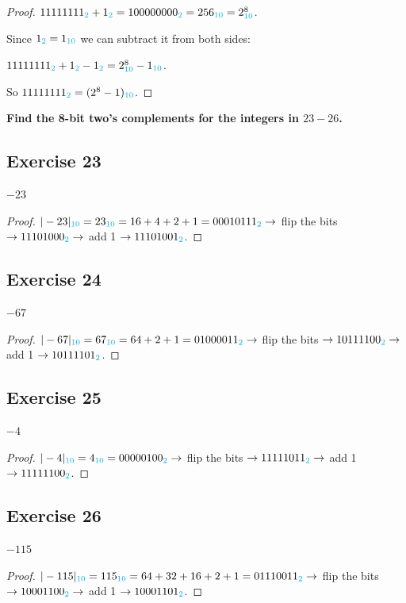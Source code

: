 \documentclass[14pt]{extarticle}
\newcommand{\base}[1]{{\color{cyan}#1}}
\begin{document}
\begin{proof} 
$11111111_\base{2} + 1_\base{2} = 100000000_\base{2} = 256_\base{10} = 2^8_\base{10}$.

Since $1_\base{2} = 1_\base{10}$ we can subtract it from both sides:

$11111111_\base{2} + 1_\base{2} - 1_\base{2} = 2^8_\base{10} - 1_\base{10}$.

So $11111111_\base{2} = (2^8 - 1)_\base{10}$. 
\end{proof}

{\bf\color{cyan} Find the 8-bit two’s complements for the integers in $23-26$.}

\subsection{Exercise 23} 
$-23$

\begin{proof} 
$|-23|_\base{10} = 23_\base{10} = 16 + 4 + 2 + 1 = 00010111_\base{2} \to$ flip the bits $\to 11101000_\base{2} \to$ add 1 $\to 11101001_\base{2}$. 
\end{proof}

\subsection{Exercise 24} 
$-67$

\begin{proof} $|-67|_\base{10} = 67_\base{10} = 64 + 2 + 1 = 01000011_\base{2} \to$ flip the bits $\to 10111100_\base{2} \to$ add 1 $\to 10111101_\base{2}$.
\end{proof}

\subsection{Exercise 25} 
$-4$

\begin{proof} 
$|-4|_\base{10} = 4_\base{10} = 00000100_\base{2} \to$ flip the
bits $\to 11111011_\base{2} \to$ add 1 $\to 11111100_\base{2}$. \end{proof}

\subsection{Exercise 26} 
$-115$

\begin{proof} 
$|-115|_\base{10} = 115_\base{10} = 64 + 32 + 16 + 2 + 1 = 01110011_\base{2} \to$ flip the bits $\to 10001100_\base{2} \to$ add 1 $\to 10001101_\base{2}$. 
\end{proof}
\end{document}
